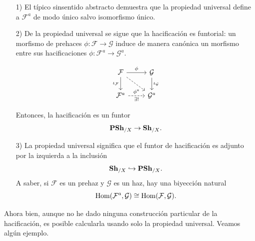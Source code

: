 \documentclass{article}
\numberwithin{equation}{section}
\theoremstyle{definition}
\begin{document}
\begin{enumerate}
\item[1)] El típico sinsentido abstracto demuestra que la propiedad universal
  define a $\mathcal{F}^a$ de modo único salvo isomorfismo único.

\item[2)] De la propiedad universal se sigue que la hacificación es funtorial:
  un morfismo de prehaces $\phi\colon \mathcal{F} \to \mathcal{G}$ induce de
  manera canónica un morfismo entre sus hacificaciones
  $\phi\colon \mathcal{F}^a \to \mathcal{G}^a$.

  \[ \begin{tikzcd}
      \mathcal{F} \ar{r}{\phi}\ar{d}[swap]{\iota_\mathcal{F}}\ar[dashed]{dr} & \mathcal{G}\ar{d}{\iota_\mathcal{G}} \\
      \mathcal{F}^a \ar[dashed]{r}{\phi^a}[swap]{\exists!} & \mathcal{G}^a
    \end{tikzcd} \]

  Entonces, la hacificación es un funtor
  $$\text{\bf PSh}_{/X} \to \text{\bf Sh}_{/X}.$$

\item[3)] La propiedad universal significa que el funtor de hacificación es
  adjunto por la izquierda a la inclusión
  $$\text{\bf Sh}_{/X} \hookrightarrow \text{\bf PSh}_{/X}.$$
  A saber, si $\mathcal{F}$ es un prehaz y $\mathcal{G}$ es un haz, hay
  una biyección natural
  $$\operatorname{Hom} (\mathcal{F}^a, \mathcal{G}) \cong \operatorname{Hom} (\mathcal{F}, \mathcal{G}).$$
\end{enumerate}

Ahora bien, aunque no he dado ninguna construcción particular de
la hacificación, es posible calcularla usando solo la propiedad
universal. Veamos algún ejemplo.
\end{document}
